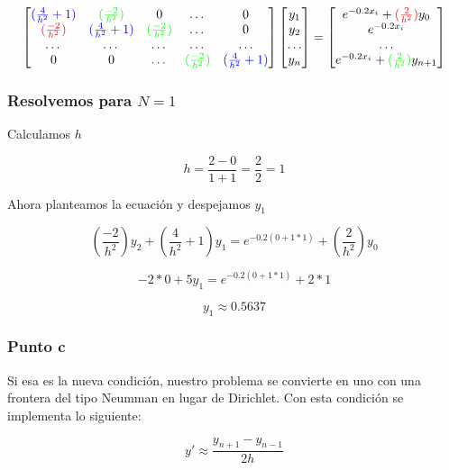 \[
\begin{bmatrix}
\textcolor{blue}{(\frac{4}{h^2} + 1)} & \textcolor{green}{(\frac{-2}{h^2})} & 0 & \dots & 0 \\
\textcolor{red}{(\frac{-2}{h^2})} & \textcolor{blue}{(\frac{4}{h^2} + 1)}  & \textcolor{green}{(\frac{-2}{h^2})} & \dots & 0 \\
\dots  & \dots  & \dots  & \dots & \dots  \\
0 & 0 & \dots & \textcolor{green}{(\frac{-2}{h^2})}  & \textcolor{blue}{(\frac{4}{h^2} + 1)}
\end{bmatrix}
\begin{bmatrix}
y_1 \\ y_2 \\ \dots \\ y_n 
\end{bmatrix}
=
\begin{bmatrix}
e^{-0.2x_i}  + \textcolor{red}{(\frac{2}{h^2})}y_0  \\ e^{-0.2x_i}  \\ \dots \\  e^{-0.2x_i}  +\textcolor{green}{(\frac{2}{h^2})}y_{n+1}
\end{bmatrix}
\]



\subsubsection*{Resolvemos para $N = 1$}

Calculamos $h$

$$h = \frac{2 - 0}{ 1 + 1} = \frac{2}{2} = 1$$

Ahora planteamos la ecuación y despejamos $y_1$

$$
(\frac{-2}{h^2})y_2 + (\frac{4}{h^2} + 1)y_1 = e^{-0.2(0 + 1*1)} + (\frac{2}{h^2})y_0
$$

$$
-2 * 0 + 5y_1 = e^{-0.2(0 + 1*1)} + 2 * 1
$$


$$
y_1 \approx 0.5637
$$


\subsubsection{Punto c}

Si esa es la nueva condición, nuestro problema se convierte en uno con una frontera del tipo Neumman en lugar de Dirichlet. Con esta condición se implementa lo siguiente: 

$$
    y' \approx \frac{y_{n +1} - y_{n- 1}}{2h}
$$


